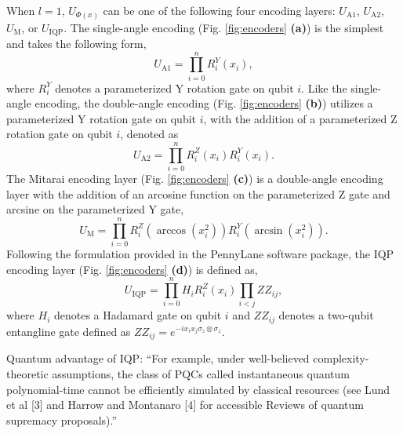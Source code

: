 \documentclass[journal=jacsat,manuscript=article]{achemso}
\begin{document}
When $l=1$, $U_{\Phi(x)}$ can be one of the following four encoding layers: $U_{\text{A1}}$, $U_{\text{A2}}$, $U_{\text{M}}$, or $U_{\text{IQP}}$.
The single-angle encoding (Fig. \ref{fig:encoders} \textbf{(a)}) is the simplest and takes the following form,
\begin{equation}
	U_{\text{A1}} = \prod_{i=0}^{n} R^{Y}_{i}(x_{i}),
	\label{eq:A1}
\end{equation}
where $R^{Y}_{i}$ denotes a parameterized Y rotation gate on qubit $i$.
Like the single-angle encoding, the double-angle encoding (Fig. \ref{fig:encoders} \textbf{(b)}) utilizes a parameterized Y rotation gate on qubit $i$, with the addition of a parameterized Z rotation gate on qubit $i$, denoted as
\begin{equation}
	U_{\text{A2}} = \prod_{i=0}^{n}  R^{Z}_{i}(x_{i}) R^{Y}_{i}(x_{i}).
	\label{eq:A2}
\end{equation}
The Mitarai encoding layer (Fig. \ref{fig:encoders} \textbf{(c)}) is a double-angle encoding layer with the addition of an arcosine function on the parameterized Z gate and arcsine on the parameterized Y gate,
\begin{equation}
	U_{\text{M}}  = \prod_{i=0}^{n} R^{Z}_{i}(\arccos (x_{i}^{2})) R^{Y}_{i}(\arcsin (x_{i}^{2})).
	\label{eq:M}
\end{equation}
Following the formulation provided in the PennyLane\cite{bergholm_pennylane_2022} software package, the IQP encoding layer (Fig. \ref{fig:encoders} \textbf{(d)}) is defined as,
\begin{equation}
	U_{\text{IQP}}  = \prod_{i=0}^{n} H_{i} R^{Z}_{i}(x_{i})  \prod_{i<j} ZZ_{ij},
	\label{eq:IQP}
\end{equation}
where $H_{i}$ denotes a Hadamard gate on qubit $i$ and $ZZ_{ij}$ denotes a two-qubit entangline gate defined as $ZZ_{ij} = e^{-i x_{i} x_{j} \sigma_{z} \otimes \sigma_{z}}$.

Quantum advantage of IQP: ``For example, under well-believed complexity-theoretic assumptions, the class of PQCs called instantaneous quantum polynomial-time cannot be efficiently simulated by classical resources (see Lund et al [3] and Harrow and Montanaro [4] for accessible Reviews of quantum supremacy proposals).''\cite{benedetti_parameterized_2019}  
  
\end{document}

